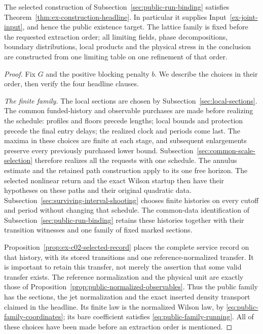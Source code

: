 \begin{theorem}
\label{thm:ex-construction-assembly}
The selected construction of Subsection~\ref{sec:public-run-binding} satisfies
Theorem~\ref{thm:ex-construction-headline}. In particular it
supplies Input~\ref{ex-joint-input}, and hence the public existence target.
The lattice family is fixed before the requested extraction order; all
limiting fields, phase decompositions, boundary distributions, local
products and the physical stress in the conclusion are constructed from
one limiting table on one refinement of that order.
\end{theorem}
\begin{proof}
Fix $G$ and the positive blocking penalty $b$. We describe the choices
in their order, then verify the four headline clauses.

\emph{The finite family.}
The local sections are chosen by Subsection~\ref{sec:local-sections}.
The common funded-history and observable purchases are made before
realizing the schedule: profiles and floors precede lengths; local
bounds and protection precede the final entry delays; the realized
clock and periods come last. The maxima in these choices are finite
at each stage, and subsequent enlargements preserve every previously
purchased lower bound. Subsection~\ref{sec:common-scale-selection}
therefore realizes all the requests with one schedule.
The annulus estimate and the retained path construction apply to its
one free horizon. The selected nonlinear return and the exact Wilson
startup then have their hypotheses on these paths and their original
quadratic data. Subsection~\ref{sec:surviving-interval-shooting} chooses
finite histories on every cutoff and period without changing that
schedule. The common-data identification of
Subsection~\ref{sec:public-run-binding} retains these histories together
with their transition witnesses and one family of fixed marked sections.

Proposition~\ref{prop:ex-c02-selected-record} places the complete
service record on that history, with its stored transitions and one
reference-normalized transfer. It is important to retain this transfer,
not merely the assertion that some valid transfer exists. The reference
normalization and the physical unit are exactly those of
Proposition~\ref{prop:public-normalized-observables}. Thus the public
family has the sections, the jet normalization and the exact inserted
density transport claimed in the headline. Its finite law is the
normalized Wilson law, by \eqref{eq:public-family-coordinates}; its
bare coefficient satisfies \eqref{eq:public-family-running}. All of
these choices have been made before an extraction order is mentioned.


\end{proof}
